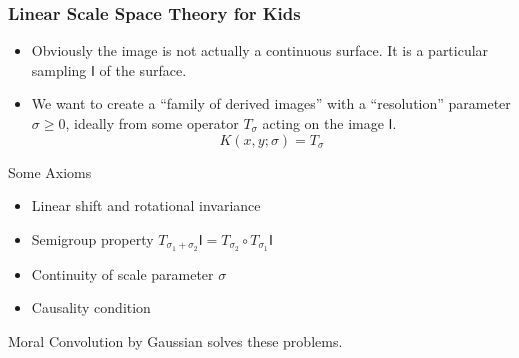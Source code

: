 \documentclass[9pt]{beamer}
\newcommand{\img}{\mathsf{I}} %
\begin{document}
\begin{frame}
\frametitle[Scale Space Theory]{Linear Scale Space Theory for Kids}
\begin{itemize}
  \item Obviously the image is not actually a continuous surface.
        It is a particular sampling $\img$ of the surface. 
  \item We want to create a ``family of derived images'' with a ``resolution'' parameter $\sigma \ge 0$,
        ideally from some operator $T_\sigma$ acting on the image $\img$.
  \begin{equation*}
  K(x,y;\sigma) = T_\sigma
  \end{equation*}
\end{itemize}

\begin{block}{Some Axioms}
  \begin{itemize}
    \item Linear shift and rotational invariance
    \item Semigroup property $T_{\sigma_1 + \sigma_2}\img = T_{\sigma_2} \circ T_{\sigma_1}\img$
    \item Continuity of scale parameter $\sigma$
    \item Causality condition
    \end{itemize}
  \end{block}
\begin{block}{Moral}
  Convolution by Gaussian solves these problems.
\end{block}
\end{frame}
\end{document}
